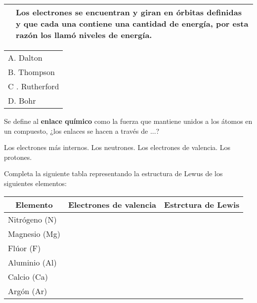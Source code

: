 \documentclass[12pt]{exam}
\begin{document}
\begin{questions}
\begin{tabular}{| p{2cm} | p{10cm} | }
 & Los electrones se encuentran y giran en órbitas definidas y que cada una contiene una cantidad de energía, por esta razón los llamó niveles de energía. \\ \hline
\end{tabular}
\begin{tabular}{l}
A. Dalton \\
B. Thompson \\
C . Rutherford \\
D. Bohr \\ 
\end{tabular}
    \newpage
    \question Se define al \textbf{enlace químico} como la fuerza que mantiene unidos a los átomos en un compuesto, ¿los enlaces se hacen a través de ...?
    \begin{choices}
        \choice Los electrones más internos.
        \choice Los neutrones.
        \choice Los electrones de valencia.
        \choice Los protones.
    \end{choices}
    \question Completa la siguiente tabla representando la estructura de Lewus de los siguientes elementos:
    \begin{table}[H]
        \renewcommand{\arraystretch}{2}
        \centering
        \begin{tabular}{| l | l | p{5cm}|} \hline
            \multicolumn{1}{|c}{\textbf{Elemento}} & \multicolumn{1}{|c|}{\textbf{Electrones de valencia}} & \multicolumn{1}{c|}{\textbf{Estrctura de Lewis}} \\ \hline
            Nitrógeno (N) & & \\ \hline
            Magnesio (Mg) & &  \\ \hline
            Flúor (F) & &  \\ \hline
            Aluminio (Al) & &  \\ \hline
            Calcio (Ca) & & \\ \hline
            Argón (Ar) & & \\ \hline
        \end{tabular}
    \end{table}
    

\end{questions}
\end{document}

